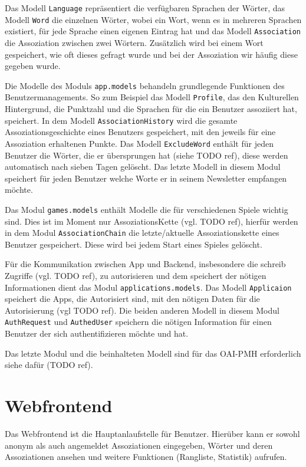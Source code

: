 Das Modell \texttt{Language} repräsentiert die verfügbaren Sprachen der Wörter, das Modell \texttt{Word} die einzelnen Wörter, wobei ein Wort, wenn es in mehreren Sprachen existiert, für jede Sprache einen eigenen Eintrag hat und das Modell \texttt{Association} die Assoziation zwischen zwei Wörtern. Zusätzlich wird bei einem Wort gespeichert, wie oft dieses gefragt wurde und bei der Assoziation wir häufig diese gegeben wurde.

Die Modelle des Moduls \texttt{app.models} behandeln grundlegende Funktionen des Benutzermanagements. So zum Beispiel das Modell \texttt{Profile}, das den Kulturellen Hintergrund, die Punktzahl und die Sprachen für die ein Benutzer assoziiert hat, speichert. In dem Modell \texttt{AssociationHistory} wird die gesamte Assoziationsgeschichte eines Benutzers gespeichert, mit den jeweils für eine Assoziation erhaltenen Punkte. Das Modell \texttt{ExcludeWord} enthält für jeden Benutzer die Wörter, die er übersprungen hat (siehe TODO ref), diese werden automatisch nach sieben Tagen gelöscht. Das letzte Modell in diesem Modul speichert für jeden Benutzer welche Worte er in seinem Newsletter empfangen möchte.

Das Modul \texttt{games.models} enthält Modelle die für verschiedenen Spiele wichtig sind. Dies ist im Moment nur AssoziationsKette (vgl. TODO ref), hierfür werden in dem Modul \texttt{AssociationChain} die letzte/aktuelle Assoziationskette eines Benutzer gespeichert. Diese wird bei jedem Start eines Spieles gelöscht.

Für die Kommunikation zwischen App und Backend, insbesondere die schreib Zugriffe (vgl. TODO ref), zu autorisieren und dem speichert der nötigen Informationen dient das Modul \texttt{applications.models}. Das Modell \texttt{Applicaion} speichert die Apps, die Autorisiert sind, mit den nötigen Daten für die Autorisierung (vgl TODO ref). Die beiden anderen Modell in diesem Modul \texttt{AuthRequest} und \texttt{AuthedUser} speichern die nötigen Information für einen Benutzer der sich authentifizieren möchte und hat.

Das letzte Modul und die beinhalteten Modell sind für das OAI-PMH erforderlich siehe dafür (TODO ref).

\section{Webfrontend}
Das Webfrontend ist die Hauptanlaufstelle für Benutzer. Hierüber kann er sowohl anonym als auch angemeldet Assoziationen eingegeben, Wörter und
deren Assoziationen ansehen und weitere Funktionen (Rangliste, Statistik)
aufrufen.

